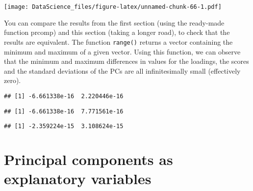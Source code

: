 \documentclass[
]{book}
\newenvironment{Shaded}{\begin{snugshade}}{\end{snugshade}}
\newcommand{\FunctionTok}[1]{\textcolor[rgb]{0.00,0.00,0.00}{#1}}
\newcommand{\NormalTok}[1]{#1}
\newcommand{\SpecialCharTok}[1]{\textcolor[rgb]{0.00,0.00,0.00}{#1}}
\begin{document}
\texttt{[image: DataScience\_files/figure-latex/unnamed-chunk-66-1.pdf]}

You can compare the results from the first section (using the ready-made function prcomp) and this section (taking a longer road), to check that the results are equivalent. The function \texttt{range()} returns a vector containing the minimum and maximum of a given vector. Using this function, we can observe that the minimum and maximum differences in values for the loadings, the scores and the standard deviations of the PCs are all infinitesimally small (effectively zero).

\begin{Shaded}
\end{Shaded}

\begin{verbatim}
## [1] -6.661338e-16  2.220446e-16
\end{verbatim}

\begin{Shaded}
\end{Shaded}

\begin{verbatim}
## [1] -6.661338e-16  7.771561e-16
\end{verbatim}

\begin{Shaded}
\end{Shaded}

\begin{verbatim}
## [1] -2.359224e-15  3.108624e-15
\end{verbatim}

\hypertarget{principal-components-as-explanatory-variables}{%
\section{Principal components as explanatory variables}\label{principal-components-as-explanatory-variables}}
\end{document}
